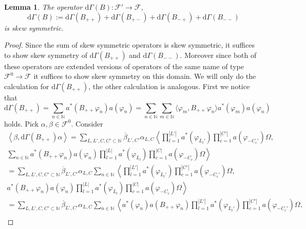 \documentclass[b5paper,draft,openbib,12pt]{memoir}
\newtheorem{Lemma}[Def]{Lemma}
\begin{document}
\begin{Lemma}
The operator \(\mathrm{d}\Gamma(B):\mathcal{F}'\rightarrow \mathcal{F}\),
\begin{equation}
\mathrm{d}\Gamma(B):=\mathrm{d}\Gamma(B_{++})+\mathrm{d}\Gamma(B_{+-})+\mathrm{d}\Gamma(B_{-+})+\mathrm{d}\Gamma(B_{--})
\end{equation}
is skew symmetric.
\end{Lemma}
\begin{proof}
Since the sum of skew symmetric operators is skew symmetric, it suffices to show skew symmetry of \(\mathrm{d}\Gamma(B_{++})\) and \(\mathrm{d}\Gamma(B_{--})\).
Moreover since both of these operators are extended versions of operators of the same name of type \(\mathcal{F}^0\rightarrow \mathcal{F}\) it suffices to show skew symmetry
on this domain. We will only do the calculation for \(\mathrm{d}\Gamma(B_{++})\), the other calculation is analogous. 
First we notice that
\begin{equation}\label{d Gamma ++ double sum}
\mathrm{d}\Gamma(B_{++})=\sum_{n\in\mathbb{N}} a^*(B_{++}\varphi_{n})a(\varphi_n)
=\sum_{n\in\mathbb{N}} \sum_{m\in\mathbb{N}}  \langle \varphi_m, B_{++}\varphi_n\rangle a^*(\varphi_m) a(\varphi_n)
\end{equation}
holds.  Pick \(\alpha,\beta \in \mathcal{F}^0\). Consider
\begin{align}\nonumber
\left\langle \beta, \mathrm{d}\Gamma(B_{++}) \alpha \right\rangle
= \sum_{L,L',C,C'\subset \mathbb{N}} \overline{\beta}_{L',C'}\alpha_{L,C} 
\left\langle \prod_{l=1}^{|L'|}a^*(\varphi_{L_l'})\prod_{c=1}^{|C'|} a(\varphi_{-C_c'})\Omega,\right. \\ \nonumber
\left. \sum_{n\in\mathbb{N}} a^*(B_{++}\varphi_{n})a(\varphi_n) \prod_{l=1}^{|L|}a^*(\varphi_{L_l})\prod_{c=1}^{|C|} a(\varphi_{-C_c})\Omega\right\rangle\\\nonumber
= \sum_{L,L',C,C'\subset \mathbb{N}} \overline{\beta}_{L',C'}\alpha_{L,C} \sum_{n\in\mathbb{N}}
\left\langle \prod_{l=1}^{|L'|}a^*(\varphi_{L_l'})\prod_{c=1}^{|C'|} a(\varphi_{-C_c'})\Omega,\right. \\ \nonumber
\left. a^*(B_{++}\varphi_{n})a(\varphi_n) \prod_{l=1}^{|L|}a^*(\varphi_{L_l})\prod_{c=1}^{|C|} a(\varphi_{-C_c})\Omega\right\rangle\\\nonumber
= \sum_{L,L',C,C'\subset \mathbb{N}} \overline{\beta}_{L',C'}\alpha_{L,C} \sum_{n\in\mathbb{N}}
\left\langle a^*(\varphi_n) a(B_{++}\varphi_{n})\prod_{l=1}^{|L'|}a^*(\varphi_{L_l'})\prod_{c=1}^{|C'|} a(\varphi_{-C_c'})\Omega,\right. \\ \nonumber

\end{align}
\end{proof}
\end{document}
